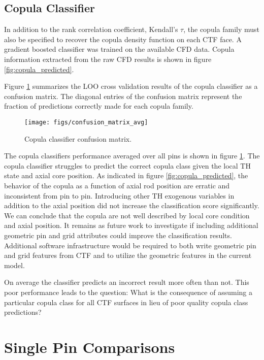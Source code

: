 \subsection{Copula Classifier}

In addition to the rank correlation coefficient, Kendall's $\tau$, the copula family must also be specified to recover the copula density function on each CTF face.  A gradient boosted classifier was trained on the available CFD data.  Copula information extracted from the raw CFD results is shown in figure \ref{fig:copula_predicted}.

Figure \ref{fig:confusionmatrixavg} summarizes the LOO cross validation results of the copula classifier as a confusion matrix.  The diagonal entries of the confusion matrix represent the fraction of predictions correctly made for each copula family.

\begin{figure}[H]
    \centering
    \texttt{[image: figs/confusion\_matrix\_avg]}
    \caption[Copula classifier confusion matrix.]{Copula classifier confusion matrix.}
    \label{fig:confusionmatrixavg}
\end{figure}


The copula classifiers performance averaged over all pins is shown in figure \ref{fig:confusionmatrixavg}. The copula classifier struggles to predict the correct copula class given the local TH state and axial core position.  As indicated in figure \ref{fig:copula_predicted}, the behavior of the copula as a function of axial rod position are erratic and inconsistent from pin to pin.  Introducing other TH exogenous variables in addition to the axial position did not increase the classification score significantly.  We can conclude that the copula are not well described by local core condition and axial position.  It remains as future work to investigate if including additional geometric pin and grid attributes could improve the classification results.  Additional software infrastructure would be required to both write geometric pin and grid features from CTF and to utilize the geometric features in the current model.

On average the classifier predicts an incorrect result more often than not.  This poor performance leads to the question:  What is the consequence of assuming a particular copula class for all CTF surfaces in lieu of poor quality copula class predictions?  

\section{Single Pin Comparisons}


